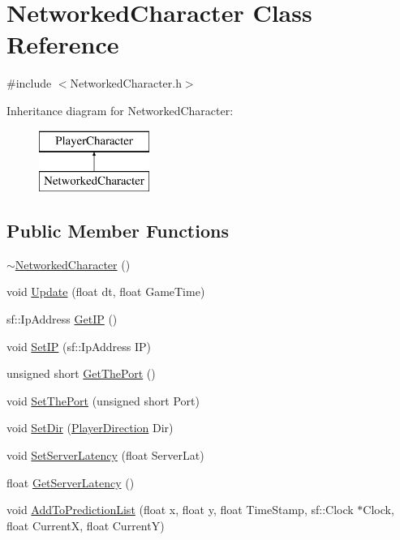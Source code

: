 \hypertarget{class_networked_character}{}\section{Networked\+Character Class Reference}
\label{class_networked_character}


{\ttfamily \#include $<$Networked\+Character.\+h$>$}

Inheritance diagram for Networked\+Character\+:\begin{figure}[H]
\begin{center}
\leavevmode
\includegraphics[height=2.000000cm]{class_networked_character}
\end{center}
\end{figure}
\subsection*{Public Member Functions}
\begin{DoxyCompactItemize}
\item 
\hyperlink{class_networked_character_ac09f304b62c04eaf431539e02b079954}{$\sim$\+Networked\+Character} ()
\item 
void \hyperlink{class_networked_character_aa445f5692ec410ff5a99ec6b6bf44e8d}{Update} (float dt, float Game\+Time)
\item 
sf\+::\+Ip\+Address \hyperlink{class_networked_character_a9b423c8353b00079e1c954704779ab31}{Get\+IP} ()
\item 
void \hyperlink{class_networked_character_a14c6d02226b324fa689dd758da7dcb34}{Set\+IP} (sf\+::\+Ip\+Address IP)
\item 
unsigned short \hyperlink{class_networked_character_af53749e10edfbbdb5ccbccd238d27091}{Get\+The\+Port} ()
\item 
void \hyperlink{class_networked_character_a306f2c2261fcdadbf53c7fadf3e85bdb}{Set\+The\+Port} (unsigned short Port)
\item 
void \hyperlink{class_networked_character_a41e76bfe05d14ebc9237031d149d6d0c}{Set\+Dir} (\hyperlink{_player_character_8h_af5420be377752b383864a169dfd7ba10}{Player\+Direction} Dir)
\item 
void \hyperlink{class_networked_character_a86f4c6a48fa251382bfd3d19872d4eb5}{Set\+Server\+Latency} (float Server\+Lat)
\item 
float \hyperlink{class_networked_character_a7692307cee60a4dec44a2a70f4b9f2c7}{Get\+Server\+Latency} ()
\item 
void \hyperlink{class_networked_character_a05c2f04191c8adc6dc733858403a39dd}{Add\+To\+Prediction\+List} (float x, float y, float Time\+Stamp, sf\+::\+Clock $\ast$Clock, float CurrentX, float CurrentY)
\end{DoxyCompactItemize}
